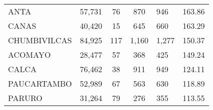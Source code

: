 \begin{tabular}{lrcclr}
	\cellcolor[HTML]{FFFF99}ANTA                                   & 57,731                                                         & 76                                                         & 870                  & 946                                                                 & 163.86                                                                       \\
	\cellcolor[HTML]{FFFF99}CANAS                                  & 40,420                                                         & 15                                                         & 645                  & 660                                                                 & 163.29                                                                       \\
	\cellcolor[HTML]{C6E0B4}CHUMBIVILCAS                           & 84,925                                                         & 117                                                        & 1,160                & 1,277                                                               & 150.37                                                                       \\
	\cellcolor[HTML]{C6E0B4}ACOMAYO                                & 28,477                                                         & 57                                                         & 368                  & 425                                                                 & 149.24                                                                       \\
	\cellcolor[HTML]{C6E0B4}CALCA                                  & 76,462                                                         & 38                                                         & 911                  & 949                                                                 & 124.11                                                                       \\
	\cellcolor[HTML]{C6E0B4}PAUCARTAMBO                            & 52,989                                                         & 67                                                         & 563                  & 630                                                                 & 118.89                                                                       \\
	\cellcolor[HTML]{C6E0B4}PARURO                                 & 31,264                                                         & 79                                                         & 276                  & 355                                                                 & 113.55                                                                       \\

\end{tabular}
